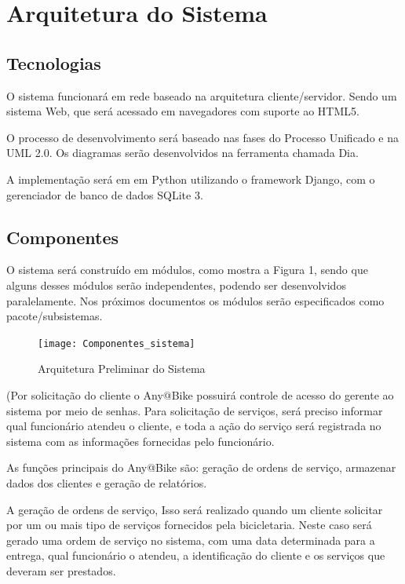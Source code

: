 \documentclass[
	12pt,				%
	openright,
	oneside,			%
	a4paper,			%
	chapter=TITLE,		%
	brazil				%
	]{abntex2}
\begin{document}
\newpage
\chapter{Arquitetura do Sistema}

\section{Tecnologias}

O sistema funcionará em rede baseado na arquitetura cliente/servidor. Sendo um sistema Web, que será acessado em navegadores com suporte ao HTML5.  

O processo de desenvolvimento será baseado nas fases do Processo Unificado e na UML 2.0. Os diagramas serão desenvolvidos na ferramenta chamada Dia.


A implementação será em em Python utilizando o framework Django, com o gerenciador de banco de dados SQLite 3.

\section{Componentes}

O sistema será construído em módulos, como mostra a Figura 1, sendo que alguns desses módulos serão independentes, podendo ser desenvolvidos paralelamente. Nos próximos documentos os módulos serão especificados como pacote/subsistemas.

\begin{figure}[hb]
	\caption{Arquitetura Preliminar do Sistema}
	\begin{center}
	    \texttt{[image: Componentes\_sistema]}
	\end{center}
\end{figure}


(Por solicitação do cliente o Any@Bike possuirá controle de acesso do gerente ao sistema por meio de senhas. Para solicitação de serviços, será preciso informar qual funcionário atendeu o cliente, e toda a ação do serviço será registrada no sistema com as informações fornecidas pelo funcionário. 

As funções principais do Any@Bike são: geração de ordens de serviço, armazenar dados dos clientes e geração de relatórios. 

A geração de ordens de serviço, Isso será realizado quando um cliente solicitar por um ou mais tipo de serviços fornecidos pela bicicletaria. Neste caso será gerado uma ordem de serviço no sistema, com uma data determinada para a entrega, qual funcionário o atendeu,  a identificação do cliente e os serviços que deveram ser prestados.
\end{document}

